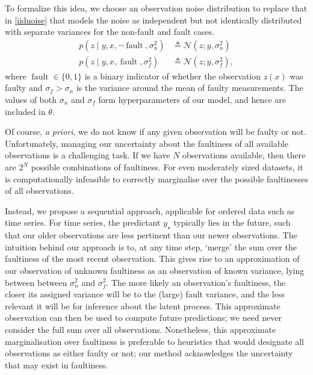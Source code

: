\documentclass{article}
\newcommand{\deq}{\ensuremath{\triangleq}}
\newcommand{\given}{\ensuremath{\mid}}
\newcommand{\cm}[1]{\ensuremath{\mathcal{#1}}}
\newcommand{\fPr}{p}
\newcommand{\st}{_{\star}}
\DeclareMathOperator{\fault}{fault}
\begin{document}
To formalize this idea, 
we choose an observation noise distribution to replace that in \eqref{iidnoise} that models the
noise as independent but not identically distributed with separate
variances for the non-fault and fault cases.
\begin{align*}
 p(z \given y, x, \neg\fault, \sigma_n^2)
 &
 \deq
 \cm{N}(z; y, \sigma_n^2)
 \\
 p(z \given y, x, \fault, \sigma_f^2)
 &
 \deq
 \cm{N}(z; y, \sigma_f^2),
\end{align*}
where $\fault \in \lbrace 0, 1 \rbrace$ is a binary indicator of
whether the observation $z(x)$ was faulty and
$\sigma_f > \sigma_n$ is the variance around the mean of faulty
measurements.  
The values of both $\sigma_n$ and $\sigma_f$ form hyperparameters of our model, and hence are included in $\theta$.

Of course, {\it a priori}, we do not know if any given observation will be faulty or not. 
Unfortunately, managing our uncertainty about the faultiness of all available observations is a challenging task. If we have $N$ observations available, then there are $2^N$ possible combinations of faultiness. For even moderately sized datasets, it is computationally infeasible to correctly marginalise over the possible faultinesses of all observations.

Instead, we propose a sequential approach, applicable for ordered data such as time series. For time series, the predictant $y\st$ typically lies in the future, such that our older observations are less pertinent than our newer observations. The intuition behind our approach is to, at any time step,
 `merge' the sum over the faultiness of the most recent observation. This gives rise to an approximation of our observation of unknown faultiness as an observation of known variance, lying between between $\sigma_n^2$ and $\sigma_f^2$. The more likely an observation's faultiness, the closer its assigned variance will be to the (large) fault variance, and the less relevant it will be for inference about the latent process. This approximate observation can then be used to compute future predictions; we need never consider the full sum over all observations. Nonetheless, this approximate marginalisation over faultiness is preferable to heuristics that would designate all observations as either faulty or not; our method acknowledges the uncertainty that may exist in faultiness. 
\end{document}
